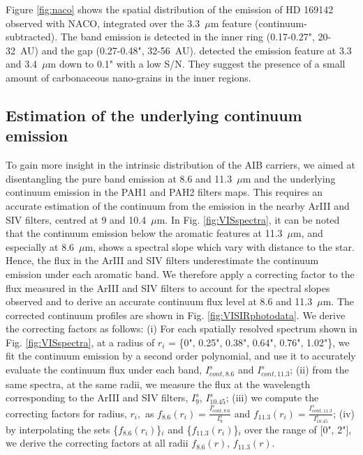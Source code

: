 \documentclass{aa}
\newcommand{\mic}{~$\mu$m\xspace}
\begin{document}
Figure \ref{fig:naco} shows the spatial distribution of the emission of HD 169142 observed with NACO, integrated over the 3.3\mic feature (continuum-subtracted). The band emission is detected in the inner ring (0.17-0.27", 20-32~AU) and the gap (0.27-0.48", 32-56~AU). \citet{Bouteraon_032019} detected the emission feature at 3.3 and 3.4\mic down to 0.1" with a low S/N. They suggest the presence of a small amount of carbonaceous nano-grains in the inner regions.

\subsection{Estimation of the underlying continuum emission} \label{sec:continuumderivation}
To gain more insight in the intrinsic distribution of the AIB carriers, we aimed at disentangling the pure band emission at 8.6 and 11.3\mic and the underlying continuum emission in the PAH1 and PAH2 filters maps. This requires an accurate estimation of the continuum from the emission in the nearby ArIII and SIV filters, centred at 9 and 10.4\mic. In Fig. \ref{fig:VISspectra}, it can be noted that the continuum emission below the aromatic features at 11.3\mic, and especially at 8.6\mic, shows a spectral slope which vary with distance to the star. Hence, the flux in the ArIII and SIV filters underestimate the continuum emission under each aromatic band. We therefore apply a correcting factor to the flux measured in the ArIII and SIV filters to account for the spectral slopes observed and to derive an accurate continuum flux level at 8.6 and 11.3\mic. The corrected continuum profiles are shown in Fig. \ref{fig:VISIRphotodata}. We derive the correcting factors as follows:
(i) For each spatially resolved spectrum shown in Fig. \ref{fig:VISspectra}, at a radius of $r_i$ = \{0", 0.25", 0.38", 0.64", 0.76", 1.02"\}, we fit the continuum emission by a second order polynomial, and use it to accurately evaluate the continuum flux under each band, $I^s_{cont, 8.6}$ and $I^s_{cont, 11.3}$; (ii) from the same spectra, at the same radii, we measure the flux at the wavelength corresponding to the ArIII and SIV filters, $I^s_{9}$, $I^s_{10.45}$;
(iii) we compute the correcting factors for radius, $r_i,$ as $f_{8.6}(r_i) = \frac{I^s_{cont, 8.6}}{I^s_{9}}$ and $f_{11.3}(r_i) = \frac{I^s_{cont, 11.3}}{I^s_{10.45}}$; (iv) by interpolating the sets \{$f_{8.6}(r_i)$\}$_{i}$ and \{$f_{11.3}(r_i)$\}$_{i}$ over the range of [0", 2"], we derive the correcting factors at all radii $f_{8.6}(r)$, $f_{11.3}(r)$. 
\end{document}
